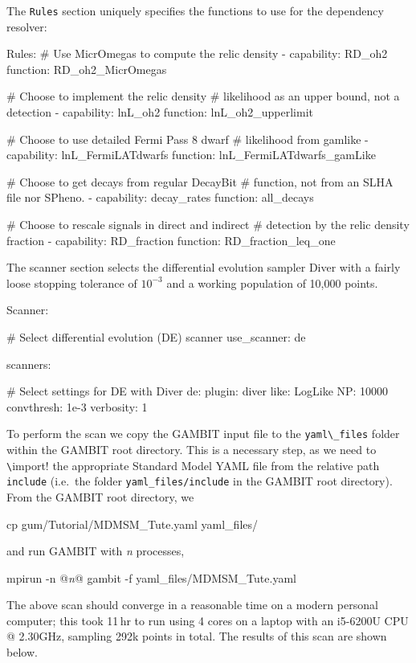 \documentclass[pdftex,twocolumn,epjc3_preprint,runningheads]{svjour3}
\renewcommand{\_}{\discretionary{\underscore}{}{\underscore}}
\newcommand\yaml[1]{{\lstset{style=yaml}\lstinline!#1!\lstset{style=cpp}}}
\newcommand\term[1]{{\lstset{style=terminal}\lstinline!#1!\lstset{style=cpp}}}
\newcommand{\metavarf}[1]{\textit{\color{darkgreen}\footnotesize\textrm{#1}}}
\newcommand{\metavar}{\metavarf}
\newcommand{\gambit}{\textsf{GAMBIT}\xspace}
\newcommand{\GB}{\gambit}
\newcommand\diver{\textsf{Diver}\xspace}
\newcommand\YAML{\textsf{YAML}\xspace}
\begin{document}
%
The \yaml{Rules} section uniquely specifies the functions to use for the dependency resolver:
%
\begin{lstyaml}
Rules:
  # Use MicrOmegas to compute the relic density
  - capability: RD_oh2
    function: RD_oh2_MicrOmegas

  # Choose to implement the relic density
  # likelihood as an upper bound, not a detection
  - capability: lnL_oh2
    function: lnL_oh2_upperlimit

  # Choose to use detailed Fermi Pass 8 dwarf
  # likelihood from gamlike
  - capability: lnL_FermiLATdwarfs
    function:  lnL_FermiLATdwarfs_gamLike

  # Choose to get decays from regular DecayBit
  # function, not from an SLHA file nor SPheno.
  - capability: decay_rates
    function: all_decays

  # Choose to rescale signals in direct and indirect
  # detection by the relic density fraction
  - capability: RD_fraction
    function: RD_fraction_leq_one
\end{lstyaml}

The scanner section selects the differential evolution sampler \diver \cite{ScannerBit} with a fairly loose stopping tolerance of $10^{-3}$ and a working population of 10,000 points.
%
\begin{lstyaml}
Scanner:

  # Select differential evolution (DE) scanner
  use_scanner: de

  scanners:

    # Select settings for DE with Diver
    de:
      plugin: diver
      like: LogLike
      NP: 10000
      convthresh: 1e-3
      verbosity: 1
\end{lstyaml}
To perform the scan we copy the \GB input file to the \term{yaml\_files} folder within the \GB root directory. This is a necessary step, as we need to \yaml{\!import} the appropriate Standard Model \YAML file from the relative path \term{include} (i.e.\ the folder \term{yaml_files/include} in the \GB root directory).  From the \GB root directory, we
%
\begin{lstterm}
cp gum/Tutorial/MDMSM_Tute.yaml yaml_files/
\end{lstterm}
%
and run \GB with \metavar{n} processes,
%
\begin{lstterm}
mpirun -n @\metavar{n}@ gambit -f yaml_files/MDMSM_Tute.yaml
\end{lstterm}

The above scan should converge in a reasonable time on a modern personal computer; this took 11\,hr to run using 4 cores on a laptop with an i5-6200U CPU @ 2.30GHz, sampling 292k points in total.  The results of this scan are shown below.
\end{document}
